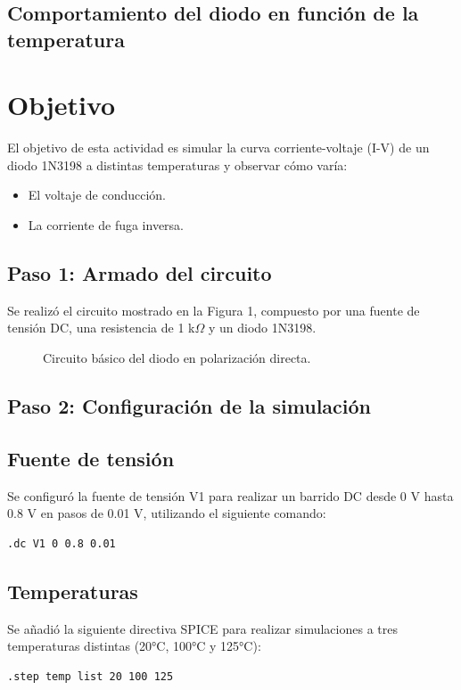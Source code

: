 \[ 
\]
\subsection{Comportamiento del diodo en función de la temperatura}
\section*{Objetivo}
El objetivo de esta actividad es simular la curva corriente-voltaje (I-V) de un diodo 1N3198 a distintas temperaturas y observar cómo varía:
\begin{itemize}
    \item El voltaje de conducción.
    \item La corriente de fuga inversa.
\end{itemize}

\subsection{Paso 1: Armado del circuito}
Se realizó el circuito mostrado en la Figura 1, compuesto por una fuente de tensión DC, una resistencia de 1 k$\Omega$ y un diodo 1N3198.

\begin{figure}[H]
    \centering
    \caption{Circuito básico del diodo en polarización directa.}
\end{figure}

\subsection{Paso 2: Configuración de la simulación}

\subsection*{Fuente de tensión}
Se configuró la fuente de tensión V1 para realizar un barrido DC desde 0 V hasta 0.8 V en pasos de 0.01 V, utilizando el siguiente comando:
\begin{verbatim}
.dc V1 0 0.8 0.01
\end{verbatim}

\subsection*{Temperaturas}
Se añadió la siguiente directiva SPICE para realizar simulaciones a tres temperaturas distintas (20°C, 100°C y 125°C):
\begin{verbatim}
.step temp list 20 100 125
\end{verbatim}

